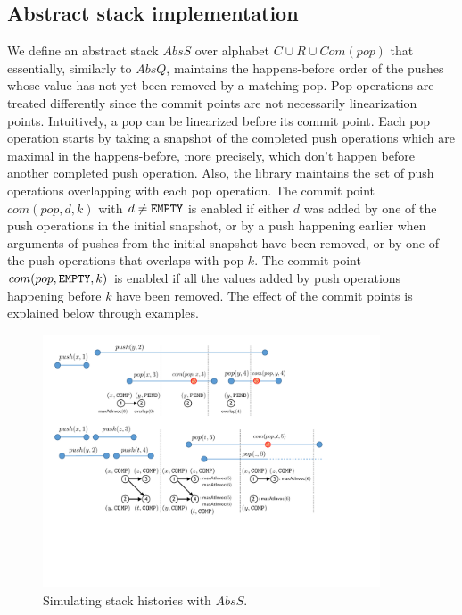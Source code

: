 \vspace{-2.5mm}
\subsection{Abstract stack implementation}
We define an abstract stack $AbsS$ over alphabet $C\cup R\cup Com(pop)$ that essentially, similarly to $AbsQ$, maintains the happens-before order of the pushes whose value has not yet been  removed by a matching pop. Pop operations are treated differently since the commit points are not necessarily linearization points. Intuitively, a pop can be linearized before its commit point. Each pop operation starts by taking a snapshot of the completed push operations which are maximal in the happens-before, more precisely, which don't happen before another completed push operation. Also, the library maintains the set of push operations overlapping with each pop operation. The commit point $com(pop,d,k)$ with $d\neq {\tt EMPTY}$ is enabled if either $d$ was added by one of the push operations in the initial snapshot, or by a push happening earlier when arguments of pushes from the initial snapshot have been removed, or by one of the push operations that overlaps with pop $k$. The commit point $com(pop,{\tt EMPTY},k)$ is enabled if all the values added by push operations happening before $k$ have been removed. The effect of the commit points is explained below through examples.
\vspace{-.4mm}

\begin{figure}[t]
\centering
\includegraphics[width=10cm]{fig-stack.pdf}
%
\vspace{-2mm}
\caption{Simulating stack histories with $AbsS$.}
\label{fig:stackSim}
\vspace{-4mm}
\end{figure}


